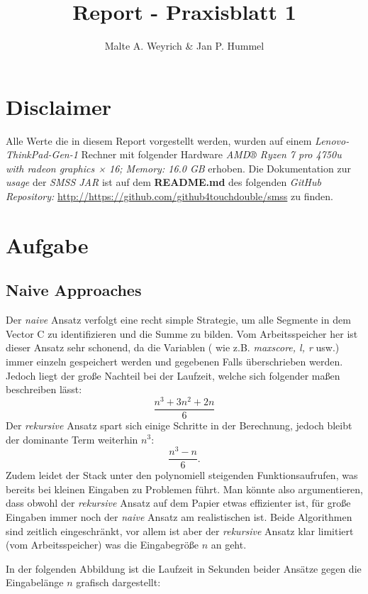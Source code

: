 \documentclass[10pt]{article}
\title{Report - Praxisblatt 1}
\author{Malte A. Weyrich \& Jan P. Hummel}
\begin{document}
\maketitle
\section*{Disclaimer}
    Alle Werte die in diesem Report vorgestellt werden, wurden auf einem \textit{Lenovo-ThinkPad-Gen-1} Rechner mit
    folgender Hardware \textit{AMD® Ryzen 7 pro 4750u with radeon graphics × 16; Memory: 16.0 GB} erhoben. 
    Die Dokumentation zur \textit{usage} der \textit{SMSS JAR} ist auf dem \textbf{README.md} des folgenden
    \textit{GitHub Repository:} \url{http://https://github.com/github4touchdouble/smss} zu finden.

\section{Aufgabe}
    \subsection{Naive Approaches}
    Der \textit{naive} Ansatz verfolgt eine recht simple Strategie, um alle Segmente in dem
    Vector C zu identifizieren und die Summe zu bilden. Vom Arbeitsspeicher her ist dieser Ansatz
    sehr schonend, da die Variablen ( wie z.B. \textit{maxscore, l, r} usw.) immer einzeln gespeichert werden
    und gegebenen Falls überschrieben werden. Jedoch liegt der gro\ss e Nachteil bei der Laufzeit, welche sich
    folgender ma\ss en beschreiben lässt:
    \[
        \frac{n^{3}+3n^{2}+2n}{6} 
    \]
    Der \textit{rekursive} Ansatz spart sich einige Schritte in der Berechnung, jedoch bleibt der dominante Term weiterhin
    $n^{3}$:
    \[
       \frac{n^{3}-n}{6}  
    .\]
    Zudem leidet der Stack unter den polynomiell steigenden Funktionsaufrufen, was bereits bei 
    kleinen Eingaben zu Problemen führt. Man könnte also argumentieren, dass obwohl der \textit{rekursive}
    Ansatz auf dem Papier etwas effizienter ist, für gro\ss e Eingaben immer noch der \textit{naive} Ansatz
    am realistischen ist. Beide Algorithmen sind zeitlich eingeschränkt, vor allem ist aber der 
    \textit{rekursive} Ansatz klar limitiert (vom Arbeitsspeicher) was die Eingabegrö\ss e $n$ an geht.
     
    In der folgenden Abbildung ist die Laufzeit in Sekunden beider Ansätze gegen die Eingabelänge $n$ grafisch dargestellt:
\end{document}
